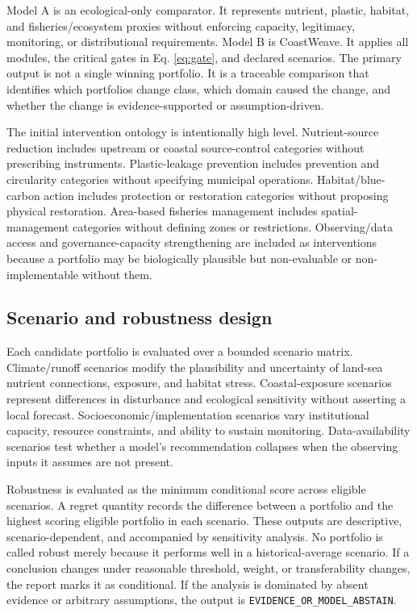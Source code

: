 \documentclass[conference]{IEEEtran}
\newcommand{\coast}{CoastWeave}
\newcommand{\state}[1]{\texttt{#1}}
\begin{document}
Model A is an ecological-only comparator. It represents nutrient, plastic, habitat, and fisheries/ecosystem proxies without enforcing capacity, legitimacy, monitoring, or distributional requirements. Model B is \coast{}. It applies all modules, the critical gates in Eq. \eqref{eq:gate}, and declared scenarios. The primary output is not a single winning portfolio. It is a traceable comparison that identifies which portfolios change class, which domain caused the change, and whether the change is evidence-supported or assumption-driven.

The initial intervention ontology is intentionally high level. Nutrient-source reduction includes upstream or coastal source-control categories without prescribing instruments. Plastic-leakage prevention includes prevention and circularity categories without specifying municipal operations. Habitat/blue-carbon action includes protection or restoration categories without proposing physical restoration. Area-based fisheries management includes spatial-management categories without defining zones or restrictions. Observing/data access and governance-capacity strengthening are included as interventions because a portfolio may be biologically plausible but non-evaluable or non-implementable without them.

\subsection{Scenario and robustness design}

Each candidate portfolio is evaluated over a bounded scenario matrix. Climate/runoff scenarios modify the plausibility and uncertainty of land-sea nutrient connections, exposure, and habitat stress. Coastal-exposure scenarios represent differences in disturbance and ecological sensitivity without asserting a local forecast. Socioeconomic/implementation scenarios vary institutional capacity, resource constraints, and ability to sustain monitoring. Data-availability scenarios test whether a model's recommendation collapses when the observing inputs it assumes are not present.

Robustness is evaluated as the minimum conditional score across eligible scenarios. A regret quantity records the difference between a portfolio and the highest scoring eligible portfolio in each scenario. These outputs are descriptive, scenario-dependent, and accompanied by sensitivity analysis. No portfolio is called robust merely because it performs well in a historical-average scenario. If a conclusion changes under reasonable threshold, weight, or transferability changes, the report marks it as conditional. If the analysis is dominated by absent evidence or arbitrary assumptions, the output is \state{EVIDENCE\_OR\_MODEL\_ABSTAIN}.
\end{document}
